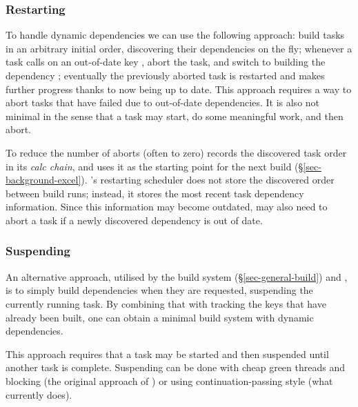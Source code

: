 \vspace{-2mm}
\subsubsection{Restarting}\label{sec-restarting}

To handle dynamic dependencies we can use the following approach: build tasks in
an arbitrary initial order, discovering their dependencies on the fly; whenever
a task calls  on an out-of-date key , abort the task, and
switch to building the dependency ; eventually the previously aborted
task is restarted and makes further progress thanks to  now being up to
date. This approach requires a way to abort tasks that have failed due to
out-of-date dependencies. It is also not minimal in the sense that a task may
start, do some meaningful work, and then abort.

To reduce the number of aborts (often to zero) \Excel records the
discovered task order in its \emph{calc chain}, and uses it as the
starting point for the next build (\S\ref{sec-background-excel}).
\Bazel's restarting scheduler does not store the discovered order
between build runs; instead, it stores the most recent task dependency
information. Since this information may become outdated, \Bazel may
also need to abort a task if a newly discovered dependency is out of date.

\vspace{-2mm}
\subsubsection{Suspending}\label{sec-suspending}

An alternative approach, utilised by the  build system
(\S\ref{sec-general-build}) and \Shake, is to simply build dependencies when
they are requested, suspending the currently running task. By combining that
with tracking the keys that have already been built, one can obtain a minimal
build system with dynamic dependencies.

This approach requires that a task may be started and then suspended until
another task is complete. Suspending can be done with cheap green threads and
blocking (the original approach of \Shake) or using continuation-passing style
\cite{claessen_continuations} (what \Shake currently does).
